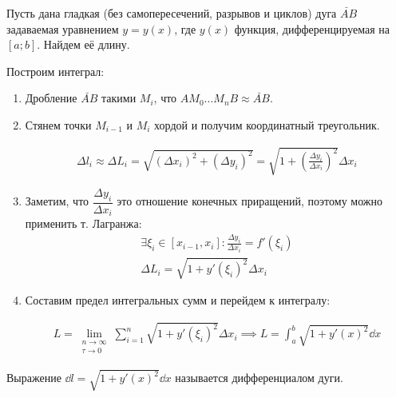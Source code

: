 
Пусть дана гладкая (без самопересечений, разрывов и циклов) дуга \(\breve{AB}\)
задаваемая уравнением \(y = y(x)\), где \(y(x)\) функция, дифференцируемая на
\([a; b]\). Найдем её длину.

Построим интеграл:
\begin{enumerate}
  \item Дробление \(\breve{AB}\) такими \(M_{i}\), что
  \(A M_{0} \dotsc M_{n} B \approx \breve{AB}\).

  \item Стянем точки \(M_{i - 1}\) и \(M_{i}\) хордой и получим координатный
  треугольник.

  \begin{multicols}{2}
    \begin{align*}
      \Delta l_{i}
      \approx \Delta L_{i}
      = \sqrt{(\Delta x_{i})^2 + (\Delta y_{i})^2}
      = \sqrt{1 + \left(\frac{\Delta y_{i}}{\Delta x_{i}}\right)^2} \Delta x_{i}
    \end{align*}
    \columnbreak

  \end{multicols}

  \item Заметим, что \(\dfrac{\Delta y_{i}}{\Delta x_{i}}\) это отношение
  конечных приращений, поэтому можно применить т. Лагранжа:
  \begin{align*}
    \exists \xi_{i} \in [x_{i - 1}, x_{i}] \colon
      \frac{\Delta y_{i}}{\Delta x_{i}} = f'(\xi_{i})
    \\
    \Delta L_{i}
    = \sqrt{1 + y'(\xi_{i})^2} \Delta x_{i}
  \end{align*}
  
  \item Составим предел интегральных сумм и перейдем к интегралу:

  \begin{align*}
    L = \lim_{\substack{n \to \infty \\ \tau \to 0}}
      \sum_{i = 1}^{n} \sqrt{1 + y'(\xi_{i})^2} \Delta x_{i}
    \implies L = \int_{a}^{b} \sqrt{1 + y'(x)^2} \dd x
  \end{align*}
\end{enumerate}

\begin{remark}
  Выражение \(\dd l = \sqrt{1 + y'(x)^2} \dd x\) называется дифференциалом дуги.
\end{remark}